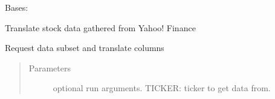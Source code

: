 \documentclass[letterpaper,10pt,english]{sphinxmanual}
\begin{document}
\begin{fulllineitems}
\label{\detokenize{dalio.translator:dalio.translator.YahooStockTranslator}}
Bases: {\hyperref[\detokenize{dalio.translator:dalio.translator.translator.Translator}]{}}

Translate stock data gathered from Yahoo! Finance

\begin{fulllineitems}
\label{\detokenize{dalio.translator:dalio.translator.YahooStockTranslator.run}}
Request data subset and translate columns
\begin{quote}\begin{description}
\item[{Parameters}] \leavevmode
{} \textendash{} optional run arguments.
TICKER: ticker to get data from.

\end{description}\end{quote}

\end{fulllineitems}


\begin{fulllineitems}
\label{\detokenize{dalio.translator:dalio.translator.YahooStockTranslator.translations}}
\end{fulllineitems}


\end{fulllineitems}

\end{document}

